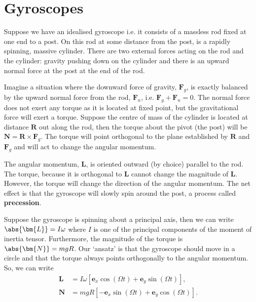 \documentclass[12pt, a4paper]{article}
\begin{document}
\section{Gyroscopes}

\begin{figure}[H]
    \centering
    \qquad \qquad
\end{figure}

Suppose we have an idealised gyroscope i.e. it consists of a massless rod fixed at one end to a post. On this rod at some distance from the post, is a rapidly spinning, massive cylinder. There are two external forces acting on the rod and the cylinder: gravity pushing down on the cylinder and there is an upward normal force at the post at the end of the rod.

Imagine a situation where the downward force of gravity, \(\bm{F}_g\), is exactly balanced by the upward normal force from the rod, \(\bm{F}_n\), i.e. \(\bm{F}_g+\bm{F}_n = 0\). The normal force does not exert any torque as it is located at fixed point, but the gravitational force will exert a torque. Suppose the centre of mass of the cylinder is located at distance \(\bm{R}\) out along the rod, then the torque about the pivot (the post) will be \(\bm{N} = \bm{R} \times \bm{F}_g\). The torque will point orthogonal to the plane established by \(\bm{R}\) and \(\bm{F}_g\) and will act to change the angular momentum.

The angular momentum, \(\bm{L}\), is oriented outward (by choice) parallel to the rod. The torque, because it is orthogonal to \(\bm{L}\) cannot change the magnitude of \(\bm{L}\). However, the torque will change the direction of the angular momentum. The net effect is that the gyroscope will slowly spin around the post, a process called \textbf{precession}.

Suppose the gyroscope is spinning about a principal axis, then we can write \(\abs{\bm{L}} = I \omega\) where \(I\) is one of the principal components of the moment of inertia tensor. Furthermore, the magnitude of the torque is \(\abs{\bm{N}} = mgR\). Our `ansatz' is that the gyroscope should move in a circle and that the torque always points orthogonally to the angular momentum. So, we can write 
\[\begin{aligned}
    \bm{L} &= I\omega \left[ \bm{e}_x \cos(\Omega t) +\bm{e}_y \sin(\Omega t) \right], \\
    \bm{N} &= mgR \left[ -\bm{e}_x\sin(\Omega t) + \bm{e}_y \cos(\Omega t) \right].
\end{aligned}\]
\end{document}
